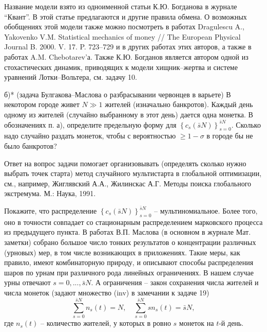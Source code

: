 \begin{problem}
\begin{remark}
Название модели взято из одноименной статьи К.Ю. 
Богданова в журнале ``Квант''. В этой 
статье предлагаются и другие правила обмена. О возможных обобщениях этой 
модели также можно посмотреть в работах Dragulescu A., Yakovenko V.M. Statistical mechanics of money // 
The European Physical Journal B. 2000. V. 17. P. 723--729 и в других работах 
этих авторов, а также в работах A.M. Chebotarev'а.
Также К.Ю. Богданов является автором одной 
из стохастических динамик, приводящих к модели хищник--жертва и системе 
уравнений Лотки--Вольтера, см. задачу 10.
\end{remark}

б)* (задача Булгакова--Маслова о разбрасывании червонцев в варьете) 
В некотором городе живет $N\gg 1$ жителей (изначально банкротов). Каждый 
день одному из жителей (случайно выбранному в этот день) дается одна 
монетка. В обозначениях п. а), определите предельную форму для $\left\{ {c_s 
\left( {\bar {s}N} \right)} \right\}_{s=0}^{\bar {s}N} $. Сколько надо 
случайно раздать монеток, чтобы с вероятностью $\ge 1-\sigma $ в городе бы 
не было банкротов?

\begin{ordre}
Ответ на вопрос задачи помогает 
организовывать (определять сколько нужно выбрать точек старта) метод 
случайного мультистарта в глобальной оптимизации, см., например, Жиглявский А.А., Жилинскас А.Г. Методы 
поиска глобального экстремума. М.: Наука, 1991.

Покажите, что распределение $\left\{ {c_s \left( {\bar 
{s}N} \right)} \right\}_{s=0}^{\bar {s}N} $ -- мультиномиальное. Более того, 
оно в точности совпадает со стационарным распределением марковского процесса 
из предыдущего пункта. В работах В.П. Маслова (в основном в журнале Мат. 
заметки) собрано большое число тонких результатов о концентрации различных 
(урновых) мер, в том числе возникающих в приложениях. Такие меры, как 
правило, имеют комбинаторную природу, и описывают способы распределения 
шаров по урнам при различного рода линейных ограничениях. В нашем случае 
урны отвечают $s=0,...,\bar {s}N$. А ограничения -- закон сохранения числа 
жителей и числа монеток (задают множество (inv) в замечании к задаче 19)
\[
\sum\limits_{s=0}^{\bar {s}N} {n_s \left( t \right)} =N,
\quad
\sum\limits_{s=0}^{\bar {s}N} {sn_s \left( t \right)} =\bar {s}N,
\]
где $n_s \left( t \right)$ -- количество жителей, у которых в ровно\textbf{ 
}$s$ монеток на $t$-й день.
\end{ordre}


\end{problem}
